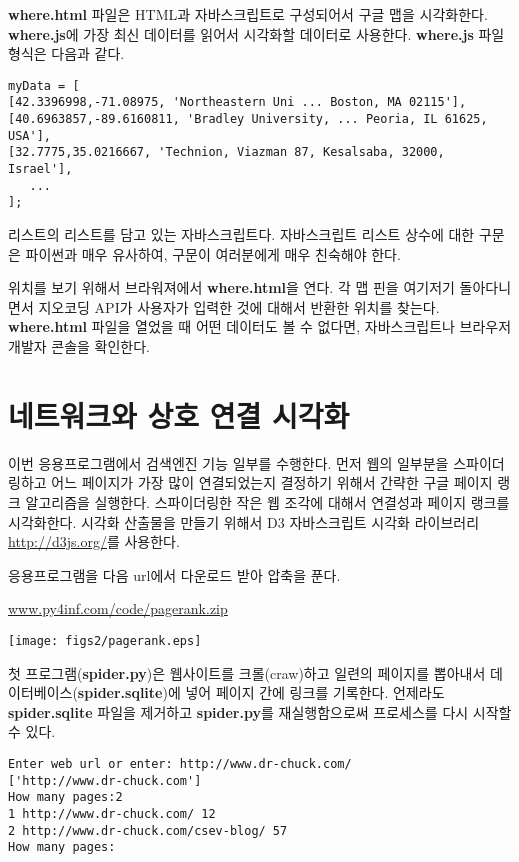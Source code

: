 {\bf where.html} 파일은 HTML과 자바스크립트로 구성되어서 구글 맵을 시각화한다.
{\bf where.js}에 가장 최신 데이터를 읽어서 시각화할 데이터로 사용한다.
{\bf where.js} 파일 형식은 다음과 같다.

\beforeverb
\begin{verbatim}
myData = [
[42.3396998,-71.08975, 'Northeastern Uni ... Boston, MA 02115'],
[40.6963857,-89.6160811, 'Bradley University, ... Peoria, IL 61625, USA'],
[32.7775,35.0216667, 'Technion, Viazman 87, Kesalsaba, 32000, Israel'],
   ...
];
\end{verbatim}
\afterverb
%

리스트의 리스트를 담고 있는 자바스크립트다. 
자바스크립트 리스트 상수에 대한 구문은 파이썬과 매우 유사하여, 구문이 여러분에게 매우 친숙해야 한다.

위치를 보기 위해서 브라워져에서 {\bf where.html}을 연다. 
각 맵 핀을 여기저기 돌아다니면서 지오코딩 API가 사용자가 입력한 것에 대해서 반환한 위치를 찾는다.
{\bf where.html} 파일을 열었을 때 어떤 데이터도 볼 수 없다면, 자바스크립트나 브라우저 개발자 콘솔을 확인한다.

\section{네트워크와 상호 연결 시각화}

이번 응용프로그램에서 검색엔진 기능 일부를 수행한다.
먼저 웹의 일부분을 스파이더링하고 어느 페이지가 가장 많이 연결되었는지 결정하기 위해서
간략한 구글 페이지 랭크 알고리즘을 실행한다.
스파이더링한 작은 웹 조각에 대해서 연결성과 페이지 랭크를 시각화한다. 
시각화 산출물을 만들기 위해서 D3 자바스크립트 시각화 라이브러리 \url{http://d3js.org/}를 사용한다.

응용프로그램을 다음 url에서 다운로드 받아 압축을 푼다.

\url{www.py4inf.com/code/pagerank.zip}

\beforefig
\centerline{\texttt{[image: figs2/pagerank.eps]}}
\afterfig

첫 프로그램({\bf spider.py})은 웹사이트를 크롤(craw)하고 일련의 페이지를 뽑아내서 데이터베이스({\bf spider.sqlite})에 넣어 페이지 간에 링크를 기록한다. 
언제라도 {\bf spider.sqlite}  파일을 제거하고 {\bf spider.py}를 재실행함으로써 프로세스를 다시 시작할 수 있다.

\beforeverb
\begin{verbatim}
Enter web url or enter: http://www.dr-chuck.com/
['http://www.dr-chuck.com']
How many pages:2
1 http://www.dr-chuck.com/ 12
2 http://www.dr-chuck.com/csev-blog/ 57
How many pages:
\end{verbatim}
\afterverb
%

